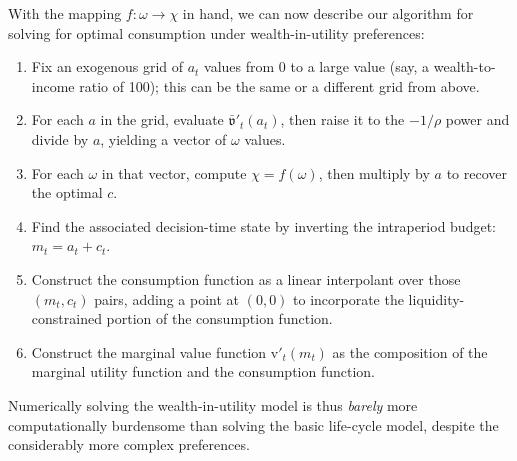 \documentclass{article}
\newcommand{\CRRA}{\rho}
\newcommand{\vFunc}{\mathrm{v}}
\newcommand{\cNrm}{c}
\newcommand{\mNrm}{m}
\newcommand{\aNrm}{a}
\begin{document}
With the mapping $f : \omega \rightarrow \chi$ in hand, we can now describe our algorithm for solving for optimal consumption under wealth-in-utility preferences:

\begin{enumerate}
\item Fix an exogenous grid of $\aNrm_t$ values from 0 to a large value (say, a wealth-to-income ratio of 100); this can be the same or a different grid from above.


\item For each $\aNrm$ in the grid, evaluate $\bar{\mathfrak{v}}'_t(\aNrm_t)$, then raise it to the $-1/\CRRA$ power and divide by $\aNrm$, yielding a vector of $\omega$ values.


\item For each $\omega$ in that vector, compute $\chi = f(\omega)$, then multiply by $\aNrm$ to recover the optimal $\cNrm$.


\item Find the associated decision-time state by inverting the intraperiod budget: $\mNrm_t = \aNrm_t + \cNrm_t$.


\item Construct the consumption function as a linear interpolant over those $(\mNrm_t, \cNrm_t)$ pairs, adding a point at $(0,0)$ to incorporate the liquidity-constrained portion of the consumption function.


\item Construct the marginal value function $\vFunc'_t(\mNrm_t)$ as the composition of the marginal utility function and the consumption function.
\end{enumerate}

Numerically solving the wealth-in-utility model is thus \textit{barely} more computationally burdensome than solving the basic life-cycle model, despite the considerably more complex preferences.





\end{document}

